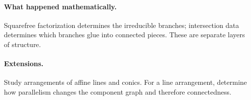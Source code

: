 \paragraph{What happened mathematically.}
Squarefree factorization determines the irreducible branches; intersection data determines
which branches glue into connected pieces.  These are separate layers of structure.
\paragraph{Extensions.}
Study arrangements of affine lines and conics.  For a line arrangement, determine how
parallelism changes the component graph and therefore connectedness.
\fi
